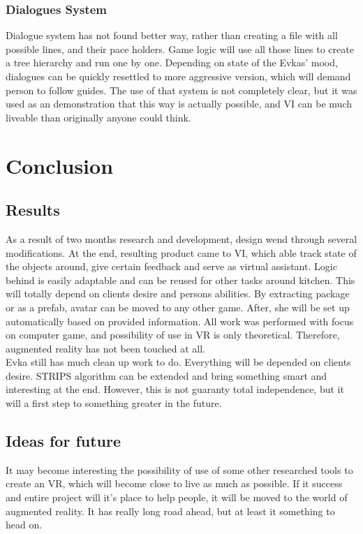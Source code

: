 \documentclass[18pt]{article}
\numberwithin{equation}{section} %
\numberwithin{figure}{section} %
\numberwithin{table}{section} %
\begin{document}
	\subsubsection{Dialogues System}
		Dialogue system has not found better way, rather than creating a file with all possible lines, and their pace holders. Game logic will use all those lines to create a tree hierarchy and run one by one. Depending on state of the Evkas' mood, dialogues can be quickly resettled to more aggressive version, which will demand person to follow guides. The use of that system is not completely clear, but it was used as an demonstration that this way is actually possible, and VI can be much liveable than originally anyone could think.
	
\section{Conclusion}
	\subsection{Results}		
		As a result of two months research and development, design wend through several modifications. At the end, resulting product came to VI, which able track state of the objects around, give certain feedback and serve as virtual assistant. Logic behind is easily adaptable and can be reused for other tasks around kitchen. This will totally depend on clients desire and persons abilities. By extracting package or as a prefab, avatar can be moved to any other game. After, she will be set up automatically based on provided information. All work was performed with focus on computer game, and possibility of use in VR is only theoretical. Therefore, augmented reality has not been touched at all.\\
		
		Evka still has much clean up work to do. Everything will be depended on clients desire. STRIPS algorithm can be extended and bring something smart and interesting at the end. However, this is not  guaranty total independence, but it will a first step to something greater in the future. \\
		
	\subsection{Ideas for future}	
		It may become interesting the possibility of use of some other researched tools to create an VR, which will become close to live as much as possible. If it success and entire project will it's place to help people, it will be moved to the world of augmented reality. It has really long road ahead, but at least it something to head on.
	
\end{document}
